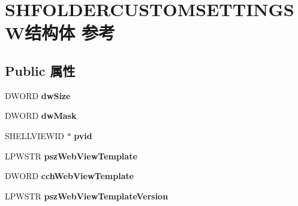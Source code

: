 \hypertarget{struct_s_h_f_o_l_d_e_r_c_u_s_t_o_m_s_e_t_t_i_n_g_s_w}{}\section{S\+H\+F\+O\+L\+D\+E\+R\+C\+U\+S\+T\+O\+M\+S\+E\+T\+T\+I\+N\+G\+S\+W结构体 参考}
\label{struct_s_h_f_o_l_d_e_r_c_u_s_t_o_m_s_e_t_t_i_n_g_s_w}
\subsection*{Public 属性}
\begin{DoxyCompactItemize}
\item 
\mbox{\label{struct_s_h_f_o_l_d_e_r_c_u_s_t_o_m_s_e_t_t_i_n_g_s_w_ac3a3f554cd9771590a186aff8946918b}} 
D\+W\+O\+RD {\bfseries dw\+Size}
\item 
\mbox{\label{struct_s_h_f_o_l_d_e_r_c_u_s_t_o_m_s_e_t_t_i_n_g_s_w_a2c25949ad2819f7e56d10d0b0c2161c0}} 
D\+W\+O\+RD {\bfseries dw\+Mask}
\item 
\mbox{\label{struct_s_h_f_o_l_d_e_r_c_u_s_t_o_m_s_e_t_t_i_n_g_s_w_a38dc4da44e26593d7c6f12e663b20d63}} 
S\+H\+E\+L\+L\+V\+I\+E\+W\+ID $\ast$ {\bfseries pvid}
\item 
\mbox{\label{struct_s_h_f_o_l_d_e_r_c_u_s_t_o_m_s_e_t_t_i_n_g_s_w_ab9fd5c42e57b47ca9d84f4a3431fb4cd}} 
L\+P\+W\+S\+TR {\bfseries psz\+Web\+View\+Template}
\item 
\mbox{\label{struct_s_h_f_o_l_d_e_r_c_u_s_t_o_m_s_e_t_t_i_n_g_s_w_a82e7e2861013867a74832cc285457d06}} 
D\+W\+O\+RD {\bfseries cch\+Web\+View\+Template}
\item 
\mbox{\label{struct_s_h_f_o_l_d_e_r_c_u_s_t_o_m_s_e_t_t_i_n_g_s_w_a0774008299d861cefcae6a031f747d4f}} 
L\+P\+W\+S\+TR {\bfseries psz\+Web\+View\+Template\+Version}
\item 

\end{DoxyCompactItemize}
